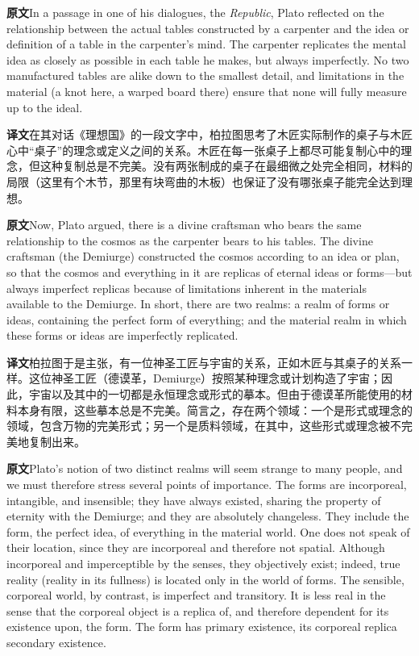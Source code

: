 \documentclass[UTF8,zihao=-4]{ctexart}
\newcommand{\BodyFont}{\fontsize{10.5pt}{15.5pt}\selectfont}
\newcommand{\origlabel}{\textbf{原文}\quad}
\newcommand{\translabel}{\textbf{译文}\quad}
\newcommand{\orig}{\par\noindent\begingroup\BodyFont\origlabel}
\newcommand{\zhline}[1]{\par\endgroup\noindent\begingroup\BodyFont\translabel #1\par\endgroup\vspace{0.35em}}
\begin{document}
\orig In a passage in one of his dialogues, the \textit{Republic}, Plato reflected on the relationship between the actual tables constructed by a carpenter and the idea or definition of a table in the carpenter's mind. The carpenter replicates the mental idea as closely as possible in each table he makes, but always imperfectly. No two manufactured tables are alike down to the smallest detail, and limitations in the material (a knot here, a warped board there) ensure that none will fully measure up to the ideal.

\zhline{在其对话《理想国》的一段文字中，柏拉图思考了木匠实际制作的桌子与木匠心中“桌子”的理念或定义之间的关系。木匠在每一张桌子上都尽可能复制心中的理念，但这种复制总是不完美。没有两张制成的桌子在最细微之处完全相同，材料的局限（这里有个木节，那里有块弯曲的木板）也保证了没有哪张桌子能完全达到理想。}

\orig Now, Plato argued, there is a divine craftsman who bears the same relationship to the cosmos as the carpenter bears to his tables. The divine craftsman (the Demiurge) constructed the cosmos according to an idea or plan, so that the cosmos and everything in it are replicas of eternal ideas or forms---but always imperfect replicas because of limitations inherent in the materials available to the Demiurge. In short, there are two realms: a realm of forms or ideas, containing the perfect form of everything; and the material realm in which these forms or ideas are imperfectly replicated.

\zhline{柏拉图于是主张，有一位神圣工匠与宇宙的关系，正如木匠与其桌子的关系一样。这位神圣工匠（德谟革，Demiurge）按照某种理念或计划构造了宇宙；因此，宇宙以及其中的一切都是永恒理念或形式的摹本。但由于德谟革所能使用的材料本身有限，这些摹本总是不完美。简言之，存在两个领域：一个是形式或理念的领域，包含万物的完美形式；另一个是质料领域，在其中，这些形式或理念被不完美地复制出来。}

\orig Plato's notion of two distinct realms will seem strange to many people, and we must therefore stress several points of importance. The forms are incorporeal, intangible, and insensible; they have always existed, sharing the property of eternity with the Demiurge; and they are absolutely changeless. They include the form, the perfect idea, of everything in the material world. One does not speak of their location, since they are incorporeal and therefore not spatial. Although incorporeal and imperceptible by the senses, they objectively exist; indeed, true reality (reality in its fullness) is located only in the world of forms. The sensible, corporeal world, by contrast, is imperfect and transitory. It is less real in the sense that the corporeal object is a replica of, and therefore dependent for its existence upon, the form. The form has primary existence, its corporeal replica secondary existence.
\end{document}

